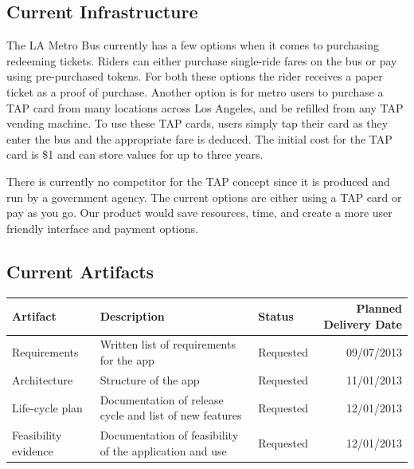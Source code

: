 \subsection{Current Infrastructure}
The LA Metro Bus currently has a few options when it comes to purchasing redeeming tickets. Riders can either purchase single-ride fares on the bus or pay using pre-purchased tokens. For both these options the rider receives a paper ticket as a proof of purchase. Another option is for metro users to purchase a TAP card from many locations across Los Angeles, and be refilled from any TAP vending machine. To use these TAP cards, users simply tap their card as they enter the bus and the appropriate fare is deduced. The initial cost for the TAP card is \$1 and can store values for up to three years. 

There is currently no competitor for the TAP concept since it is produced and run by a government agency. The current options are either using a TAP card or pay as you go. Our product would save resources, time, and create a more user friendly interface and payment options.

\subsection{Current Artifacts}
\begin{table}[h]
    \begin{tabularx}{\textwidth}{lXlr}\hline
    Artifact              & Description                                              & Status & Planned Delivery Date          \\
    \hline
    Requirements          & Written list of requirements for the app                 & Requested                   & 09/07/2013                              \\
    Architecture          & Structure of the app                                     & Requested                   & 11/01/2013                              \\
    Life-cycle plan       &  Documentation of release cycle and list of new features & Requested                   & 12/01/2013                             \\
    Feasibility evidence  & Documentation of feasibility of the application and use  & Requested                   & 12/01/2013                              \\
    \hline
    \end{tabularx}
\end{table}
\newpage
